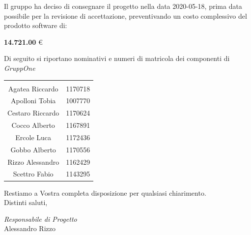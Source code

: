\documentclass{article}
\begin{document}
Il gruppo ha deciso di consegnare il progetto nella data 2020-05-18, prima data possibile per la revisione di accettazione, preventivando un costo complessivo del prodotto software di:
\begin{center}
  \textbf{14.721.00} €
\end{center}
\newpage
Di seguito si riportano nominativi e numeri di matricola dei componenti di \textit{GruppOne}
\begin{table}[H]%
  \label{tab:componenti}
  \centering
  \begin{tabular}[c]{c c}
    \rowcolor{darkgray!90!}\color{white}{\textbf{Nominativo}} & \color{white}{\textbf{Matricola}} \\
    Agatea Riccardo                                           & 1170718                           \\
    Apolloni Tobia                                            & 1007770                           \\
    Cestaro Riccardo                                          & 1170624                           \\
    Cocco Alberto                                             & 1167891                           \\
    Ercole Luca                                               & 1172436                           \\
    Gobbo Alberto                                             & 1170556                           \\
    Rizzo Alessandro                                          & 1162429                           \\
    Scettro Fabio                                             & 1143295                           \\
  \end{tabular}
\end{table}
Restiamo a Vostra completa disposizione per qualsiasi chiarimento.\\
Distinti saluti,

\hspace{2cm}
\begin{adjustwidth}{2.5cm}{10.5cm}
  \centering
  \textit{Responsabile di Progetto}\\
  Alessandro Rizzo\\
  \hspace{2cm}
  \underline{\color{white}{Responsabile di Progetto}}
\end{adjustwidth}
\end{document}

